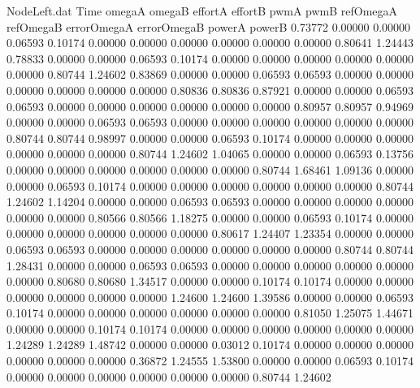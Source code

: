 \begin{filecontents}{NodeLeft.dat}
Time omegaA omegaB effortA effortB pwmA pwmB refOmegaA refOmegaB errorOmegaA errorOmegaB powerA powerB
   0.73772    0.00000    0.00000     0.06593    0.10174    0.00000    0.00000    0.00000    0.00000    0.00000    0.00000    0.80641    1.24443
   0.78833    0.00000    0.00000     0.06593    0.10174    0.00000    0.00000    0.00000    0.00000    0.00000    0.00000    0.80744    1.24602
   0.83869    0.00000    0.00000     0.06593    0.06593    0.00000    0.00000    0.00000    0.00000    0.00000    0.00000    0.80836    0.80836
   0.87921    0.00000    0.00000     0.06593    0.06593    0.00000    0.00000    0.00000    0.00000    0.00000    0.00000    0.80957    0.80957
   0.94969    0.00000    0.00000     0.06593    0.06593    0.00000    0.00000    0.00000    0.00000    0.00000    0.00000    0.80744    0.80744
   0.98997    0.00000    0.00000     0.06593    0.10174    0.00000    0.00000    0.00000    0.00000    0.00000    0.00000    0.80744    1.24602
   1.04065    0.00000    0.00000     0.06593    0.13756    0.00000    0.00000    0.00000    0.00000    0.00000    0.00000    0.80744    1.68461
   1.09136    0.00000    0.00000     0.06593    0.10174    0.00000    0.00000    0.00000    0.00000    0.00000    0.00000    0.80744    1.24602
   1.14204    0.00000    0.00000     0.06593    0.06593    0.00000    0.00000    0.00000    0.00000    0.00000    0.00000    0.80566    0.80566
   1.18275    0.00000    0.00000     0.06593    0.10174    0.00000    0.00000    0.00000    0.00000    0.00000    0.00000    0.80617    1.24407
   1.23354    0.00000    0.00000     0.06593    0.06593    0.00000    0.00000    0.00000    0.00000    0.00000    0.00000    0.80744    0.80744
   1.28431    0.00000    0.00000     0.06593    0.06593    0.00000    0.00000    0.00000    0.00000    0.00000    0.00000    0.80680    0.80680
   1.34517    0.00000    0.00000     0.10174    0.10174    0.00000    0.00000    0.00000    0.00000    0.00000    0.00000    1.24600    1.24600
   1.39586    0.00000    0.00000     0.06593    0.10174    0.00000    0.00000    0.00000    0.00000    0.00000    0.00000    0.81050    1.25075
   1.44671    0.00000    0.00000     0.10174    0.10174    0.00000    0.00000    0.00000    0.00000    0.00000    0.00000    1.24289    1.24289
   1.48742    0.00000    0.00000     0.03012    0.10174    0.00000    0.00000    0.00000    0.00000    0.00000    0.00000    0.36872    1.24555
   1.53800    0.00000    0.00000     0.06593    0.10174    0.00000    0.00000    0.00000    0.00000    0.00000    0.00000    0.80744    1.24602

\end{filecontents}
